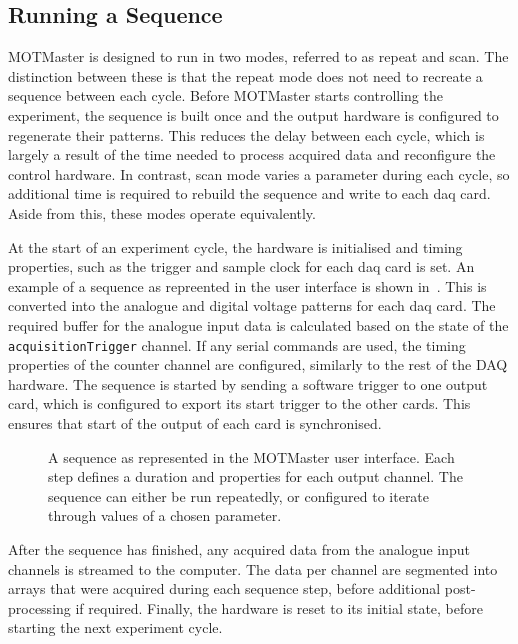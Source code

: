 \subsection{Running a Sequence}
MOTMaster is designed to run in two modes, referred to as repeat and scan.
The distinction between these is that the repeat mode does not need to
recreate a sequence between each cycle. Before MOTMaster starts controlling
the experiment, the sequence is built once and the output hardware is configured
to regenerate their patterns. This reduces the delay between
each cycle, which is largely a result of the time needed to process acquired
data and reconfigure the control hardware. In contrast, scan mode varies a
parameter during each cycle, so additional time is required to rebuild the
sequence and write to each \ac{daq} card. Aside from this, these modes
operate equivalently. \par\noindent
At the start of an experiment cycle, the hardware is
initialised and timing properties, such as the trigger and sample clock for
each \ac{daq} card is set. An example of a sequence as repreented in the user interface is shown in~. This is
converted into the analogue and digital voltage patterns for each \ac{daq}
card. The required buffer for the analogue input
data is calculated based on the state of the \verb|acquisitionTrigger|
channel. If any serial commands are used, the timing properties of the
counter channel are configured, similarly to the rest of the \ac{DAQ}
hardware. The sequence is started by sending a software trigger to one output
card, which is configured to export its start trigger to the other cards.
This ensures that start of the output of each card is synchronised. 
\begin{figure}
    \centering
    \caption[MOTMaster user interface]{A sequence as represented in the MOTMaster user interface. Each step defines a duration and properties for each output channel. The sequence can either be run repeatedly, or configured to iterate through values of a chosen parameter.}
    \label{fig:motmaster_sequence}
\end{figure}
\par\noindent
After the sequence has finished, any acquired data from the analogue input channels is
streamed to the computer. The data per channel are segmented into arrays that
were acquired during each sequence step, before additional post-processing if
required. Finally, the hardware is reset to its initial state, before
starting the next experiment cycle.

